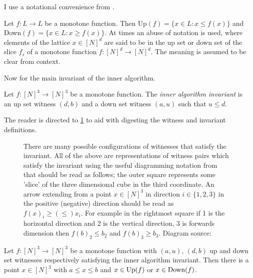 I use a notational convenience from \citep{fasterTarski}.
\begin{notation}
  Let $f : L \to L$ be a monotone function. Then Up$(f) = \{x \in L : x \leq f(x)\}$
  and Down$(f) = \{x \in L : x \geq f(x)\}$. At times an abuse of notation is used,
  where elements of the lattice $x \in [N]^d$ are said to be in the up set or down
  set of the slice $f_s$ of a monotone function $f : [N]^d \to [N]^d$. The meaning
  is assumed to be clear from context.
\end{notation}
Now for the main invariant of the inner algorithm.
\begin{definition}
  Let $f : [N]^3 \to [N]^3$ be a monotone function. The \emph{inner algorithm invariant}
  is an up set witness $(d, b)$ and a down set witness $(a, u)$ such that $u \leq d$.
\end{definition}
The reader is directed to \cref{witnessFig} to aid with digesting the witness and invariant
definitions.
\begin{figure}[ht] \label{witnessFig}
  \centering
  \scalebox{0.4}{}
  \caption{There are many possible configurations of witnesses that satisfy the invariant.
  All of the above are representations of witness pairs which satisfy the invariant using the useful diagramming
  notation from \citep{fasterTarski} that should be read as follows; the outer square
  represents some 'slice' of the three dimensional cube in the third coordinate. An arrow
  extending from a point $x \in [N]^3$ in direction $i \in \{1, 2, 3\}$ in the positive (negative) direction
  should be read as $f(x)_i \geq (\leq) x_i$. For example in the rightmost square if 1 is the horizontal
  direction and 2 is the vertical direction, 3 is forwards dimension then $f(b)_2 \leq b_2$ and $f(b)_3 \geq b_3$. 
  Diagram source: \citep{fasterTarski}}
\end{figure}
\begin{lemma}
  Let $f : [N]^3 \to [N]^3$ be a monotone function with $(a, u)$, $(d, b)$ up
  and down set witnesses respectively satisfying the inner algorithm invariant.
  Then there is a point $x \in [N]^3$ with $a \leq x \leq b$ and $x \in \mathrm{Up}(f)$ or $x \in \text{Down}(f)$.
\end{lemma}
